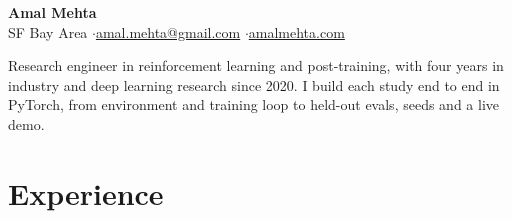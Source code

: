 \documentclass[10pt]{article}
\begin{document}
\fontsize{9.8}{10.5}\selectfont

\begin{center}
{\LARGE\bfseries Amal Mehta}\\[3pt]
SF Bay Area \quad$\cdot$\quad \href{mailto:amal.mehta@gmail.com}{amal.mehta@gmail.com} \quad$\cdot$\quad \href{https://amalmehta.com/}{amalmehta.com}
\end{center}

Research engineer in reinforcement learning and post-training, with four years in industry and deep learning research since 2020. I build each study end to end in PyTorch, from environment and training loop to held-out evals, seeds and a live demo.

\section*{Experience}
\end{document}
